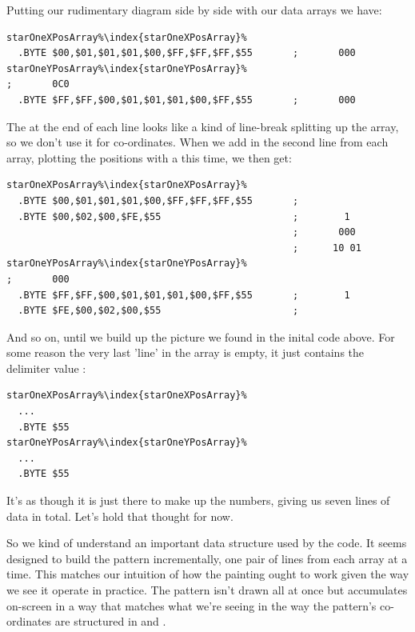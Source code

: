 Putting our rudimentary diagram side by side with our data arrays we have:
\begin{lstlisting}[escapechar=\%]
starOneXPosArray%\index{starOneXPosArray}%  
  .BYTE $00,$01,$01,$01,$00,$FF,$FF,$FF,$55       ;       000      
starOneYPosArray%\index{starOneYPosArray}%                                  ;       0C0        
  .BYTE $FF,$FF,$00,$01,$01,$01,$00,$FF,$55       ;       000      
\end{lstlisting}

The  at the end of each line looks like a kind of line-break splitting up the array, so we don't use it for
co-ordinates. 
When we add in the second line from each array, plotting the positions with a  this time, we then get:
\clearpage
\begin{lstlisting}[caption=Source code for the Star.,escapechar=\%]
starOneXPosArray%\index{starOneXPosArray}%  
  .BYTE $00,$01,$01,$01,$00,$FF,$FF,$FF,$55       ;                
  .BYTE $00,$02,$00,$FE,$55                       ;        1 
                                                  ;       000      
                                                  ;      10 01       
starOneYPosArray%\index{starOneYPosArray}%                                  ;       000
  .BYTE $FF,$FF,$00,$01,$01,$01,$00,$FF,$55       ;        1  
  .BYTE $FE,$00,$02,$00,$55                       ; 
\end{lstlisting}

And so on, until we build up the picture we found in the inital code above. For some reason the very last 'line' in the 
array is empty, it just contains the delimiter value :

\begin{lstlisting}[escapechar=\%]
starOneXPosArray%\index{starOneXPosArray}%  
  ...
  .BYTE $55  
starOneYPosArray%\index{starOneYPosArray}%  
  ...
  .BYTE $55      
\end{lstlisting}

It's as though it is just there to make up the numbers, giving us
seven lines of data in total. Let's hold that thought for now.

So we kind of understand an important data structure used
by the code. It seems designed to build the pattern incrementally, one pair of lines from each array at a time.
This matches our intuition of how the painting ought to work given the way we see it operate in practice. The pattern isn't drawn
all at once but accumulates on-screen in a way that matches what we're seeing in the way the pattern's co-ordinates
are structured in  and .

